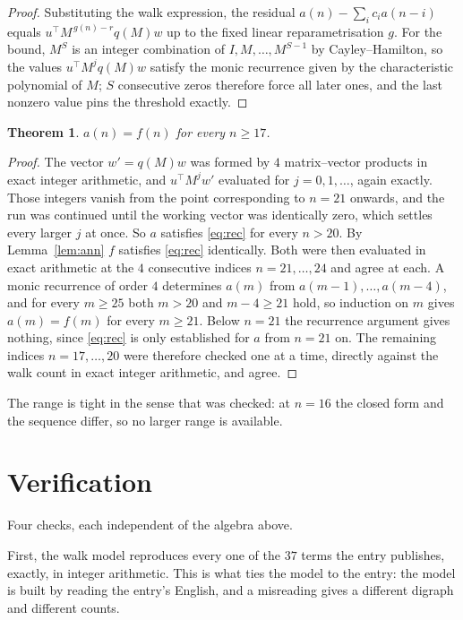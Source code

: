 \documentclass[11pt,a4paper]{article}
\theoremstyle{plain}
\newtheorem{theorem}{Theorem}
\theoremstyle{definition}
\begin{document}
\begin{proof}
Substituting the walk expression, the residual $a(n)-\sum_ic_ia(n-i)$ equals
$u^{\!\top}M^{\,g(n)-r}q(M)w$ up to the fixed linear reparametrisation $g$. For the bound,
$M^{S}$ is an integer combination of $I,M,\dots,M^{S-1}$ by Cayley--Hamilton, so the values
$u^{\!\top}M^{j}q(M)w$ satisfy the monic recurrence given by the characteristic polynomial of
$M$; $S$ consecutive zeros therefore force all later ones, and the last nonzero value pins the
threshold exactly.
\end{proof}

\begin{theorem}
$a(n)=f(n)$ for every $n\ge17$.
\end{theorem}

\begin{proof}
The vector $w'=q(M)w$ was formed by $4$ matrix--vector products in exact integer
arithmetic, and $u^{\!\top}M^{j}w'$ evaluated for $j=0,1,\dots$, again exactly. Those integers
vanish from the point corresponding to $n=21$ onwards, and the run was continued until the
working vector was identically zero, which settles every larger $j$ at once. So $a$ satisfies
\eqref{eq:rec} for every $n>20$. By Lemma~\ref{lem:ann} $f$ satisfies \eqref{eq:rec}
identically. Both were then evaluated in exact arithmetic at the $4$ consecutive indices
$n=21,\dots,24$ and agree at each. A monic recurrence of order $4$
determines $a(m)$ from $a(m-1),\dots,a(m-4)$, and for every $m\ge25$ both
$m>20$ and $m-4\ge21$ hold, so induction on $m$ gives $a(m)=f(m)$ for every
$m\ge21$.
Below $n=21$ the recurrence argument gives nothing, since \eqref{eq:rec} is only
established for $a$ from $n=21$ on. The remaining indices $n=17,\dots,20$ were
therefore checked one at a time, directly against the walk count in exact integer arithmetic,
and agree.
\end{proof}

The range is tight in the sense that was checked: at $n=16$ the closed form and the sequence differ, so no larger range is available.

\section{Verification}

Four checks, each independent of the algebra above.

First, the walk model reproduces every one of the $37$ terms the entry publishes,
exactly, in integer arithmetic. This is what ties the model to the entry: the model is built
by reading the entry's English, and a misreading gives a different digraph and different
counts.
\end{document}
